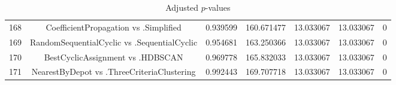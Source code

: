 \documentclass[a4paper,10pt]{article}
\begin{document}
\begin{landscape}
\begin{table}[!htp]
\begin{tabular}{ccccccc}
168&CoefficientPropagation vs .Simplified&0.939599&160.671477&13.033067&13.033067&0\\
169&RandomSequentialCyclic vs .SequentialCyclic&0.954681&163.250366&13.033067&13.033067&0\\
170&BestCyclicAssignment vs .HDBSCAN&0.969778&165.832033&13.033067&13.033067&0\\
171&NearestByDepot vs .ThreeCriteriaClustering&0.992443&169.707718&13.033067&13.033067&0\\
\hline
\end{tabular}
\caption{Adjusted $p$-values}
\end{table}

\end{landscape}
\end{document}

